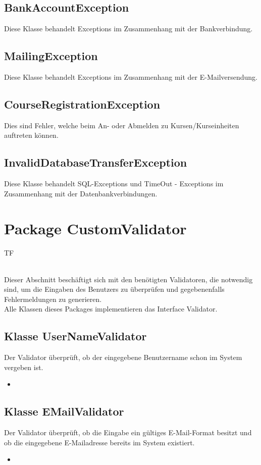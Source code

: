 	\subsection{BankAccountException}
	Diese Klasse behandelt Exceptions im Zusammenhang mit der Bankverbindung.
	
	\subsection{MailingException}
	Diese Klasse behandelt Exceptions im Zusammenhang mit der E-Mailversendung.
	
	\subsection{CourseRegistrationException}
    Dies sind Fehler, welche beim An- oder Abmelden zu Kursen/Kurseinheiten auftreten können. 
	
	\subsection{InvalidDatabaseTransferException}
	Diese Klasse behandelt SQL-Exceptions und  TimeOut - Exceptions im Zusammenhang mit der Datenbankverbindungen.
	
	\section{Package CustomValidator}
	\begin{tiny}
		TF\\
	\end{tiny}\\
	Dieser Abschnitt beschäftigt sich mit den benötigten Validatoren, die notwendig sind, um die Eingaben des Benutzers zu überprüfen und gegebenenfalls Fehlermeldungen zu generieren.\\
	Alle Klassen dieses Packages implementieren das Interface Validator.
	
	\subsection{Klasse UserNameValidator}
	Der Validator überprüft, ob der eingegebene Benutzername schon im System vergeben ist.
	\begin{itemize}
		\item \override
	\end{itemize}
	
	\subsection{Klasse EMailValidator}
	Der Validator überprüft, ob die Eingabe ein gültiges E-Mail-Format besitzt und ob die eingegebene E-Mailadresse bereits im System existiert.
	\begin{itemize}
		\item \override
	\end{itemize}
	
